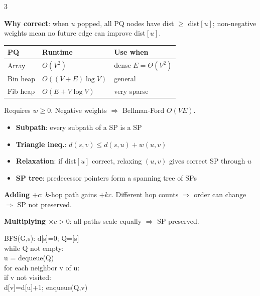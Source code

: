 \documentclass[9pt]{extarticle}
\newcommand{\gb}[1]{\vspace{1pt}\noindent\colorbox{lightmint}  {\parbox{\dimexpr\linewidth-2\fboxsep}{\footnotesize\sffamily #1}}\vspace{1pt}}
\newcommand{\rb}[1]{\vspace{1pt}\noindent\colorbox{lightred}   {\parbox{\dimexpr\linewidth-2\fboxsep}{\footnotesize\sffamily #1}}\vspace{1pt}}
\newcommand{\cd}[1]{{\fontsize{7}{8.5}\selectfont\ttfamily\noindent #1}}
\begin{document}
\begin{multicols}{3}
\begin{tcolorbox}[teal,title=Dijkstra --- Algorithm \& Runtimes]
\vspace{2pt}\textbf{Why correct}: when $u$ popped, all PQ nodes have dist $\geq$ dist$[u]$; non-negative weights mean no future edge can improve dist$[u]$.

\begin{center}\scriptsize
\begin{tabular}{@{}lll@{}}
\toprule PQ&Runtime&Use when\\\midrule
Array&$O(V^2)$&dense $E{=}\Theta(V^2)$\\
Bin heap&$O((V{+}E)\log V)$&general\\
Fib heap&$O(E{+}V\log V)$&very sparse\\\bottomrule
\end{tabular}
\end{center}
\rb{Requires $w\geq 0$. Negative weights $\Rightarrow$ Bellman-Ford $O(VE)$.}
\end{tcolorbox}

\vspace{3pt}
\begin{tcolorbox}[teal,title=Shortest Path Properties]
\small
\begin{itemize}
  \item \textbf{Subpath}: every subpath of a SP is a SP
  \item \textbf{Triangle ineq.}: $d(s,v)\leq d(s,u)+w(u,v)$
  \item \textbf{Relaxation}: if dist$[u]$ correct, relaxing $(u,v)$ gives correct SP through $u$
  \item \textbf{SP tree}: predecessor pointers form a spanning tree of SPs
\end{itemize}
\rb{\textbf{Adding $+c$}: $k$-hop path gains $+kc$. Different hop counts $\Rightarrow$ order can change $\Rightarrow$ SP not preserved.}
\gb{\textbf{Multiplying $\times c>0$}: all paths scale equally $\Rightarrow$ SP preserved.\checkmark}
\end{tcolorbox}

\vspace{3pt}
\begin{tcolorbox}[teal,title=BFS --- Algorithm \& Edge Property]
\small
\cd{BFS(G,s): d[s]=0; Q=[s]\\
while Q not empty:\\
\quad u = dequeue(Q)\\
\quad for each neighbor v of u:\\
\quad\quad if v not visited:\\
\quad\quad\quad d[v]=d[u]+1; enqueue(Q,v)}


\end{tcolorbox}
\end{multicols}
\end{document}
